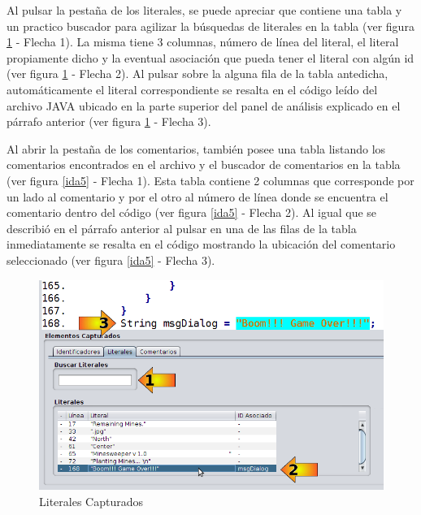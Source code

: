\documentclass[a4paper,12pt]{report}
\begin{document}
Al pulsar la pestaña de los literales, se puede apreciar que contiene una tabla y un practico buscador para agilizar la búsquedas de literales en la tabla (ver figura \ref{ida4} - Flecha 1). La misma tiene 3 columnas, número de línea del literal, el literal propiamente dicho y la eventual asociación que pueda tener el literal con algún id (ver figura \ref{ida4} - Flecha 2). Al pulsar sobre la alguna fila de la tabla antedicha, automáticamente el literal correspondiente se resalta en el código leído del archivo JAVA ubicado en la parte superior del panel de análisis explicado en el párrafo anterior (ver figura \ref{ida4} - Flecha 3).

Al abrir la pestaña de los comentarios, también posee una tabla listando los comentarios encontrados en el archivo y el buscador de comentarios en la tabla (ver figura \ref{ida5} - Flecha 1). Esta tabla contiene 2 columnas que corresponde por un lado al comentario y por el otro al número de línea donde se encuentra el comentario dentro del código (ver figura \ref{ida5} - Flecha 2). Al igual que se describió en el párrafo anterior al pulsar en una de las filas de la tabla inmediatamente se resalta en el código mostrando la ubicación del comentario seleccionado (ver figura \ref{ida5} - Flecha 3).

\begin{figure}[t] %
\centerline{%
\includegraphics[scale= 0.55]{./ida_04.png}
}
\caption{Literales Capturados}
\label{ida4}
\end{figure}
\end{document}
